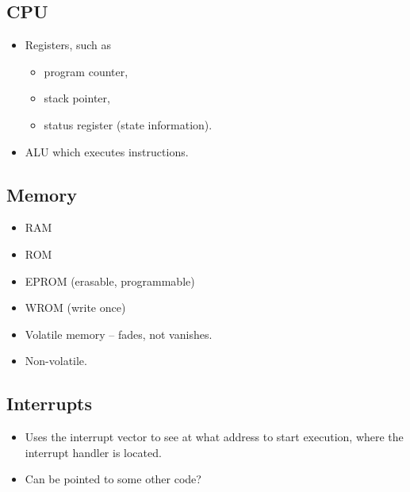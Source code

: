 \documentclass{beamer}
\begin{document}
\subsection{CPU}

\begin{frame}{\insertsubsectionhead}
  \begin{itemize}
    \item Registers, such as
      \begin{itemize}
        \item program counter,
        \item stack pointer,
        \item status register (state information).
      \end{itemize}

    \item ALU which executes instructions.
  \end{itemize}
\end{frame}

\subsection{Memory}

\begin{frame}{\insertsubsectionhead}
  \begin{itemize}
    \item RAM
    \item ROM
    \item EPROM (erasable, programmable)
    \item WROM (write once)
  \end{itemize}
\end{frame}

\begin{frame}{\insertsubsectionhead}
  \begin{itemize}
    \item Volatile memory -- fades, not vanishes.
    \item Non-volatile.
  \end{itemize}
\end{frame}

\subsection{Interrupts}

\begin{frame}{\insertsubsectionhead}
  \begin{itemize}
    \item Uses the interrupt vector to see at what address to start execution, 
      where the interrupt handler is located.

    \item Can be pointed to some other code?

  \end{itemize}
\end{frame}
\end{document}
